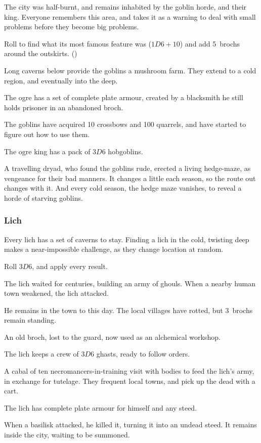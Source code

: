 \begin{multicols}{2}
\begin{dlist}
  The city was half-burnt, and remains inhabited by the goblin horde, and their king.
  Everyone remembers this area, and takes it as a warning to deal with small problems before they become big problems.

  Roll to find what its most famous feature was ($1D6+10$) and add 5~\glspl{broch} around the outskirts.
  ()
  \item
  Long caverns below provide the goblins a mushroom farm.
  They extend to a cold region, and eventually into the \gls{deep}.
  \item
  The ogre has a set of complete plate armour, created by a blacksmith he still holds prisoner in an abandoned \gls{broch}.
  \item
  The goblins have acquired 10 crossbows and 100 quarrels, and have started to figure out how to use them.
  \item
  The ogre king has a pack of $3D6$ hobgoblins.
  \item
  A travelling dryad, who found the goblins rude, erected a living hedge-maze, as vengeance for their bad manners.
  It changes a little each season, so the route out changes with it.
  And every cold season, the hedge maze vanishes, to reveal a horde of starving goblins.
\end{dlist}

\subsubsection{Lich}
\label{lichPoint}

Every lich has a set of caverns to stay.
Finding a lich in the cold, twisting \gls{deep} makes a near-impossible challenge, as they change location at random.

Roll $3D6$, and apply every result.

\begin{dlist}
  \item
  The lich waited for centuries, building an army of ghouls.
  When a nearby human town weakened, the lich attacked.

  He remains in the town to this day.
  The local \glspl{village} have rotted, but 3~\glspl{broch} remain standing.
  \item
  An old \gls{broch}, lost to the \gls{guard}, now used as an alchemical workshop.
  \item
  The lich keeps a crew of $3D6$ ghasts, ready to follow orders.
  \item
  A cabal of ten necromancers-in-training visit with bodies to feed the lich's army, in exchange for tutelage.
  They frequent local towns, and pick up the dead with a cart.
  \item
  The lich has complete plate armour for himself and any steed.
  \item
  When a basilisk attacked, he killed it, turning it into an undead steed.
  It remains inside the city, waiting to be summoned.
\end{dlist}

\end{multicols}

